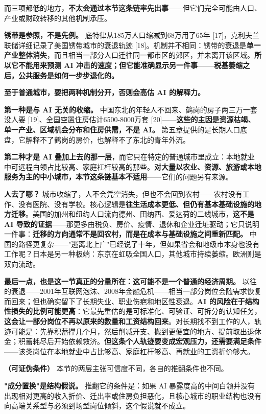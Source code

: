 \documentclass[11pt,a4paper]{ctexart}
\begin{document}
而三项都低的地方，\textbf{不太会通过本节这条链率先出事}——但它们完全可能由人口、产业或财政转移的其他机制承压。

\textbf{锈带是参照，不是先例。} 底特律从185万人口缩减到68万用了65年 [17]，克利夫兰联储详细记录了美国锈带城市的衰退轨迹 [18]。机制并不相同：锈带的衰退是\textbf{单一产业整体消失}，而且相当一部分人口迁往同一都市区的郊区，并未离开该区域。\textbf{所以它不能用来预测 AI 冲击的速度；但它能准确显示另一件事——税基萎缩之后，公共服务是如何一步步退化的。}

\textbf{至于普通城市，要把两种机制分开，否则会高估 AI 的解释力。}

\textbf{第一种是与 AI 无关的收缩。} 中国东北的年轻人不回来、鹤岗的房子两三万一套没人要 [19]、全国空置住房估计6500-8000万套 [20]——\textbf{这些的主因是资源枯竭、单一产业、区域机会分布和住房供需，不是 AI。} 第五章提供的是长期人口底盘，它解释不了鹤岗的房价，也解释不了东北的青年外流。

\textbf{第二种才是 AI 叠加上去的那一层}，而它只在特定的普通城市里成立：本地就业中可远程白领占比较高、家庭杠杆较高的那些。\textbf{对大量以农业、资源、旅游或本地服务为主的中小城市，本节这条链基本不适用}——它们的问题另有来源。

\textbf{人去了哪？} 城市收缩了，人不会凭空消失，但也不会回到农村——农村没有工作、没有医院、没有学校。核心逻辑是\textbf{往生活成本更低、但仍有基本基础设施的地方迁移}。美国的加州和纽约人口流向德州、田纳西、爱达荷的二线城市，\textbf{这不是 AI 导致的证据}——那更多由税负、房价、疫情、退休和企业迁址驱动；它只说明一件事：\textbf{迁移的方向通常不是回农村，而是在成本与基础设施之间重新匹配。} 中国的路径更复杂——"逃离北上广"已经说了十年，但如果省会和地级市本身也没有工作呢？日本是另一种极端：东京在虹吸全国人口，其他城市持续萎缩。欧洲则是双向流动。

\textbf{最后一点，也是这一节真正的分量所在：这可能不是一个普通的经济周期。} 以往的衰退——2001年互联网泡沫、2008年金融危机——相当一部分岗位会随需求恢复而回来；但也确实留下了长期失业、职业伤疤和地区性衰退。\textbf{AI 的风险在于结构性损失的比例可能更高}：它最先重估的是可标准化、可验证、可拆分的认知任务，\textbf{这会让一部分岗位不再以原来的数量和工资结构回来}。对长期找不到工作的人，轨迹可能是：先靠积蓄撑几个月，然后削减开支、搬到更便宜的地方、提前取出退休金；积蓄耗尽后开始依赖救济。\textbf{但这条个人轨迹要变成宏观压力，还需要满足条件}——该类岗位在本地就业中占比够高、家庭杠杆够高、再就业的工资折价够大。

\textbf{（可证伪条件）} 本节的两层主张可信度不同，各自的推翻条件也不同。

\textbf{"成分置换"是结构假说。} 推翻它的条件是：如果 AI 暴露度高的中间白领并没有出现相对更高的收入折价、迁出率或住房负担恶化，且核心城市的职业结构也没有向高端关系型与必须到场型岗位倾斜，这个假说就不成立。
\end{document}
